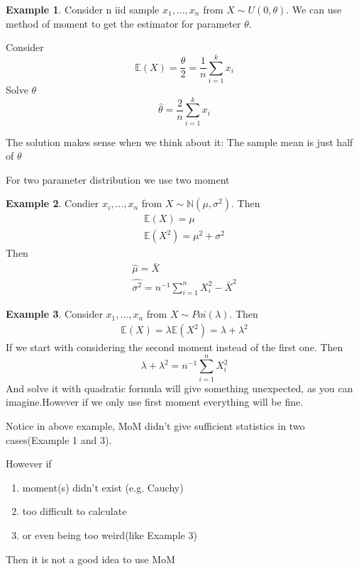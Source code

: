 \documentclass{article}
\theoremstyle{definition}
\newtheorem{example}{Example}
\begin{document}
\begin{example}
	Consider n iid sample $x_1, \dots,x_n$ from $X \sim U(0,\theta)$. We can use method of moment to get the estimator for parameter $\theta$. 
	
	Consider
	\begin{equation*}
		\mathbb{E}(X) = \frac{\theta}{2} = \frac{1}{n}\sum_{i=1}^{k} x_i
	\end{equation*}
	Solve $\theta$
	\begin{equation*}
		\hat{\theta} = \frac{2}{n}\sum_{i=1}^{k} x_i
	\end{equation*}
\end{example}
The solution makes sense when we think about it: The sample mean is just half of $\theta$

For two parameter distribution we use two moment
\begin{example}
	Condier $x_i ,\dots,x_n$ from $X \sim \mathbb{N}(\mu,\sigma^2)$. Then 
	\begin{align*}
		\mathbb{E}(X) = \mu \\
		\mathbb{E}(X^2) = \mu^2 + \sigma^2
	\end{align*}
	Then 
	\begin{align*}
		\hat{\mu} = \bar{X} \\
		\hat{\sigma^2} = n^{-1}\sum_{i=1}^{n} X_i^2 -\bar{X}^2
	\end{align*}
\end{example}
\begin{example}
	Consider $x_1,\dots,x_n$ from $X \sim Poi(\lambda)$. Then
	\begin{align*}
		\mathbb{E}(X) = \lambda
		\mathbb{E}(X^2) = \lambda + \lambda^2
	\end{align*}
	If we start with considering the second moment instead of the first one. Then
	\begin{equation*}
		\lambda + \lambda^2 = n^{-1}\sum_{i=1}^{n} X_i^2
	\end{equation*}
	And solve it with quadratic formula will give something unexpected, as you can imagine.However if we only use first moment everything will be fine.
\end{example}

Notice in above example, MoM didn't give sufficient statistics in two cases(Example 1 and 3).

However if 
\begin{enumerate}
	\item moment(s) didn't exist (e.g. Cauchy)
	\item too difficult to calculate
	\item or even being too weird(like Example 3)
\end{enumerate}
Then it is not a good idea to use MoM
\end{document}
